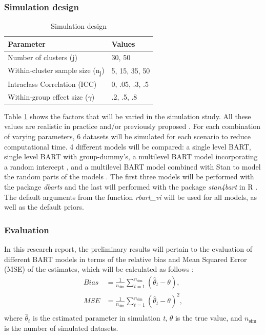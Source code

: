 \documentclass[10pt, a4paper, titlepage]{article}
\begin{document}
\subsubsection{Simulation design}
\begin{table}
\centering
\caption{Simulation design}
\label{tab:simulationparameters}
\begin{tabular}{l|l}
\textbf{Parameter}                                  & \textbf{Values} \\ \hline
Number of clusters (j)                              & 30, 50          \\
Within-cluster sample size (n\textsubscript{j})     & 5, 15, 35, 50   \\
Intraclass Correlation (ICC)                        & 0, .05, .3, .5  \\
Within-group effect size ($\gamma$)                 & .2, .5, .8
\end{tabular}
\end{table}

Table \ref{tab:simulationparameters} shows the factors that will be varied in the simulation study. All these values are realistic in practice and/or previously proposed \citep{gulliford1999, murray2003, hox2017, grund2018, enders2018a, enders2020}. For each combination of varying parameters, 6 datasets will be simulated for each scenario to reduce computational time. 4 different models will be compared: a single level BART, single level BART with group-dummy's, a multilevel BART model incorporating a random intercept \citep{chen2020, wagner2020, tan2016, wundervald2022}, and a multilevel BART model combined with Stan to model the random parts of the models \citep{dorie2022}. The first three models will be performed with the package \textit{dbarts} \citep{dorie2023} and the last will performed with the package \textit{stan4bart} \citep{dorie2023a} in R \citep{rcoreteam2023}. The default arguments from the function \textit{rbart\_vi} will be used for all models, as well as the default priors.

\subsubsection{Evaluation}
In this research report, the preliminary results will pertain to the evaluation of different BART models in terms of the relative bias and Mean Squared Error (MSE) of the estimates, which will be calculated as follows \citep{morris2019}:
\begin{subequations}
\label{eq:evaluations}
\begin{align}
Bias &= \frac{1}{n_{\text{sim}}} \sum_{t=1}^{n_{\text{sim}}} (\hat{\theta}_t - \theta), \tag{5} \\
MSE &= \frac{1}{n_{\text{sim}}} \sum_{t=1}^{n_{\text{sim}}} (\hat{\theta}_t - \theta)^{2}, \tag{6} \\
\end{align}
\end{subequations}
where $\hat{\theta}_t$ is the estimated parameter in simulation \textit{t}, $\theta$ is the true value, and $n_{\text{sim}}$ is the number of simulated datasets.
\end{document}
